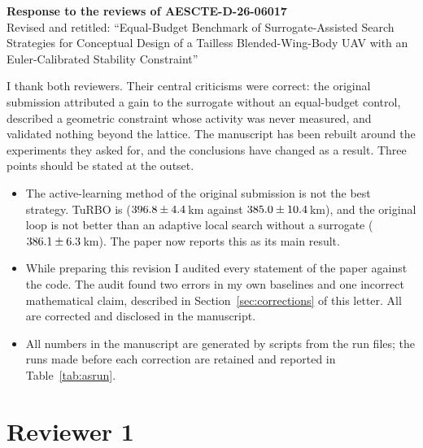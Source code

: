 \documentclass[11pt]{article}
\begin{document}
\begin{center}
{\large\bfseries Response to the reviews of AESCTE-D-26-06017}\\[2pt]
Revised and retitled: ``Equal-Budget Benchmark of Surrogate-Assisted Search Strategies for Conceptual Design of a Tailless Blended-Wing-Body UAV with an Euler-Calibrated Stability Constraint''
\end{center}

I thank both reviewers. Their central criticisms were correct: the original submission attributed a gain to the surrogate without an equal-budget control, described a geometric constraint whose activity was never measured, and validated nothing beyond the lattice. The manuscript has been rebuilt around the experiments they asked for, and the conclusions have changed as a result. Three points should be stated at the outset.

\begin{itemize}[leftmargin=1.5em,itemsep=2pt]
    \item The active-learning method of the original submission is not the best strategy. TuRBO is ($396.8 \pm 4.4$\,km against $385.0 \pm 10.4$\,km), and the original loop is not better than an adaptive local search without a surrogate ($386.1 \pm 6.3$\,km). The paper now reports this as its main result.
    \item While preparing this revision I audited every statement of the paper against the code. The audit found two errors in my own baselines and one incorrect mathematical claim, described in Section~\ref{sec:corrections} of this letter. All are corrected and disclosed in the manuscript.
    \item All numbers in the manuscript are generated by scripts from the run files; the runs made before each correction are retained and reported in Table~\ref{tab:asrun}.
\end{itemize}

\section*{Reviewer 1}
\end{document}
